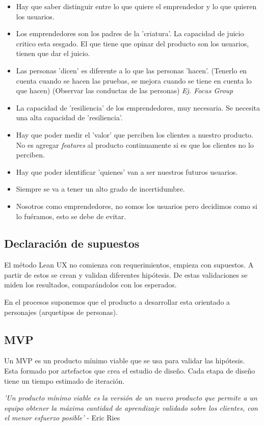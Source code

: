 \documentclass[titlepage,a4paper]{article}
\begin{document}
\begin{itemize}
    \item Hay que saber distinguir entre lo que quiere el emprendedor y lo que quieren los usuarios.
    \item Los emprendedores son los padres de la 'criatura'. La capacidad de juicio critico esta sesgado. El que tiene que opinar del producto son los usuarios, tienen que dar el juicio.
    \item Las personas 'dicen' es diferente a lo que las personas 'hacen'. (Tenerlo en cuenta cuando se hacen las pruebas, se mejora cuando se tiene en cuenta lo que hacen) (Observar las conductas de las personas) \textit{Ej. Focus Group}
    \item La capacidad de 'resiliencia' de los emprendedores, muy necesaria. Se necesita una alta capacidad de 'resiliencia'.
    \item Hay que poder medir el 'valor' que perciben los clientes a nuestro producto. No es agregar \emph{features} al producto continuamente si es que los clientes no lo perciben.
    \item Hay que poder identificar 'quienes' van a ser nuestros futuros usuarios.
    \item Siempre se va a tener un alto grado de incertidumbre.
    \item Nosotros como emprendedores, no somos los usuarios pero decidimos como si lo fuéramos, esto se debe de evitar. 
\end{itemize}

\subsection{Declaración de supuestos}
El método Lean UX no comienza con requerimientos, empieza con supuestos. A partir de estos se crean y validan diferentes hipótesis. De estas validaciones se miden los resultados, comparándolos con los esperados.

En el procesos suponemos que el producto a desarrollar esta orientado a personajes (arquetipos de personas).

\subsection{MVP}
Un MVP es un producto mínimo viable que se usa para validar las hipótesis. Esta formado por artefactos que crea el estudio de diseño. Cada etapa de diseño tiene un tiempo estimado de iteración.


\begin{center}
\textit{'Un producto mínimo viable es la versión de un nuevo producto que permite a un equipo obtener la máxima cantidad de aprendizaje validado sobre los clientes, con el menor esfuerzo posible'} - Eric Ries
\end{center}
\end{document}
